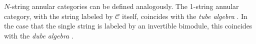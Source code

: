 \begin{definition}
	$N$-string annular categories can be defined analogously. The 1-string annular category, with the string labeled by $\mathcal{C}$ itself, coincides with the \emph{tube algebra} \cite{ocneanu}. In the case that the single string is labeled by an invertible bimodule, this coincides with the \emph{dube algebra} \cite{WBV17}. 
\end{definition}